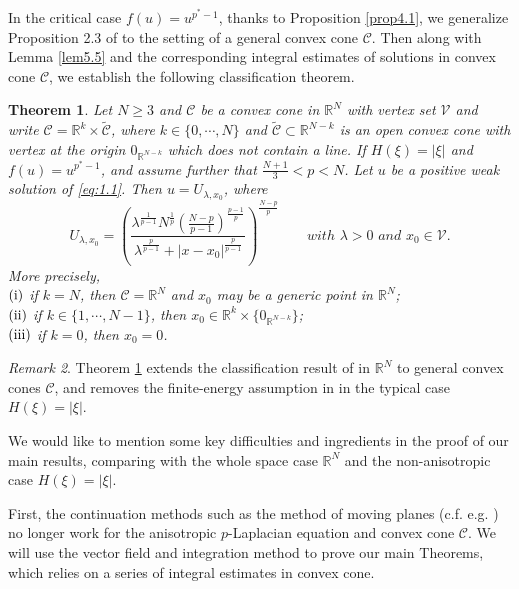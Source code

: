 \documentclass[12pt]{amsart}
\newtheorem{thm}{Theorem}[section]
\theoremstyle{definition}
\theoremstyle{remark}
\newtheorem{rem}[thm]{Remark}
\theoremstyle{conclusion}
\theoremstyle{conjecture}
\numberwithin{equation}{section}
\begin{document}
In the critical case $f(u)=u^{p^*-1}$, thanks to Proposition \ref{prop4.1}, we generalize Proposition 2.3 of \cite{Ou} to the setting of a general convex cone $\mathcal{C}$. Then along with Lemma \ref{lem5.5} and the corresponding integral estimates of solutions in convex cone $\mathcal{C}$, we establish the following classification theorem.

\begin{thm}\label{cla}
  Let $N\geq3$ and $\mathcal{C}$ be a convex cone in $\mathbb{R}^{N}$ with vertex set $\mathcal{V}$ and write $\mathcal{C}=\mathbb{R}^{k}\times\mathcal{\widetilde{C}}$, where $k\in\{0,\cdots ,N\}$ and $\mathcal{\widetilde{C}}\subset\mathbb{R}^{N-k}$ is an open convex cone with vertex at the origin $0_{\mathbb{R}^{N-k}}$ which does not contain a line.
  If $H(\xi)=|\xi|$ and $f(u)=u^{p^*-1}$, and assume further that $\frac{N+1}{3}<p<N$. Let $u$ be a positive weak solution of \eqref{eq:1.1}. Then $u=U_{\lambda,x_0}$, where
  $$U_{\lambda,x_0}=\left(\frac{\lambda^{\frac{1}{p-1}}N^{\frac{1}{p}}(\frac{N-p}{p-1})^{\frac{p-1}{p}}}{\lambda^{\frac{p}{p-1}}+|x-x_0|^{\frac{p}{p-1}}}\right)^{\frac{N-p}{p}} \qquad with\,\, \lambda>0\,\,and \,\,x_0\in \mathcal{V}.$$
  More precisely, \\
  $(\rm{i})$ if $k=N$, then $\mathcal{C}=\mathbb{R}^N$ and $x_0$ may be a generic point in $\mathbb{R}^N$;\\
  $(\rm{ii})$ if  $k\in\{1,\cdots ,N-1\}$, then $x_0\in\mathbb{R}^k\times\{0_{\mathbb{R}^{N-k}}\}$;\\
  $(\rm{iii})$ if $k=0$, then $x_0=0$.
\end{thm}

\begin{rem}
Theorem \ref{cla} extends the classification result of \cite{Ou} in $\mathbb{R}^{N}$ to general convex cones $\mathcal{C}$, and removes the finite-energy assumption in \cite{CFR} in the typical case $H(\xi)=|\xi|$.
\end{rem}

\smallskip

We would like to mention some key difficulties and ingredients in the proof of our main results, comparing with the whole space case $\mathbb{R}^{N}$ and the non-anisotropic case $H(\xi)=|\xi|$.

\smallskip

First, the continuation methods such as the method of moving planes (c.f. e.g. \cite{CY,CK,CL,CW,DLL,DLS,DQ1,DFSV,DMMS,Lin,Sc,S,S2,T,Ve,WX}) no longer work for the anisotropic $p$-Laplacian equation and convex cone $\mathcal{C}$. We will use the vector field and integration method to prove our main Theorems, which relies on a series of integral estimates in convex cone.
\end{document}
